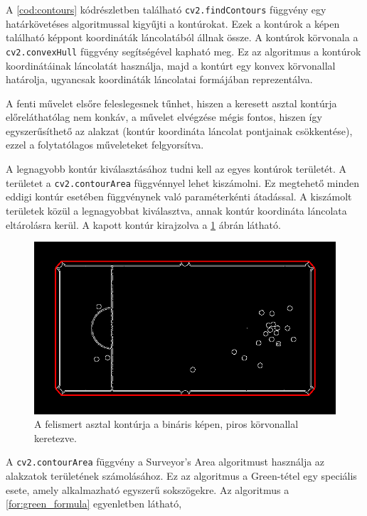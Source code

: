 \par A \ref{cod:contours} kódrészletben található \lstinline{cv2.findContours} függvény \cite{opencv_docs, SUZUKI198532} egy határkövetéses algoritmussal kigyűjti a kontúrokat. Ezek a kontúrok a képen található képpont koordináták láncolatából állnak össze. A kontúrok körvonala a \lstinline{cv2.convexHull} függvény \cite{opencv_docs, SKLANSKY198279} segítségével kapható meg. Ez az algoritmus a kontúrok koordinátáinak láncolatát használja, majd a kontúrt egy konvex körvonallal határolja, ugyancsak koordináták láncolatai formájában reprezentálva.
\par A fenti művelet elsőre feleslegesnek tűnhet, hiszen a keresett asztal kontúrja előreláthatólag nem konkáv, a művelet elvégzése mégis fontos, hiszen így egyszerűsíthető az alakzat (kontúr koordináta láncolat pontjainak csökkentése), ezzel a folytatólagos műveleteket felgyorsítva.
\par A legnagyobb kontúr kiválasztásához tudni kell az egyes kontúrok területét. A területet a \lstinline{cv2.contourArea} függvénnyel \cite{opencv_docs} lehet kiszámolni. Ez megtehető minden eddigi kontúr esetében függvénynek való paraméterkénti átadással. A kiszámolt területek közül a legnagyobbat kiválasztva, annak kontúr koordináta láncolata eltárolásra kerül. A kapott kontúr kirajzolva a \ref{fig:bemeneti_kep_contour} ábrán látható.

\begin{figure}[!ht]
    \centering
    \includegraphics[width=140mm, keepaspectratio]{figures/input_screen_contour.png}
    \caption{A felismert asztal kontúrja a bináris képen, piros körvonallal keretezve.}
    \label{fig:bemeneti_kep_contour}
\end{figure}

\par A \lstinline{cv2.contourArea} függvény a Surveyor's Area algoritmust \cite{braden1986surveyor} használja az alakzatok területének számolásához. Ez az algoritmus a Green-tétel egy speciális esete, amely alkalmazható egyszerű sokszögekre.
\newline Az algoritmus a \ref{for:green_formula} egyenletben látható,

